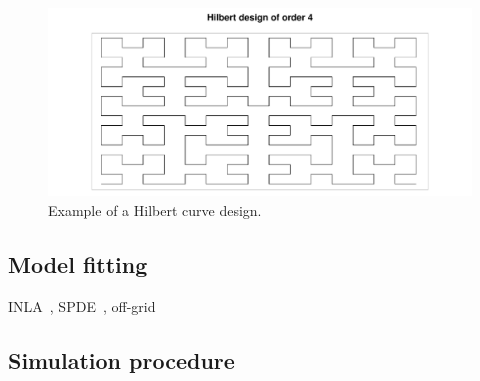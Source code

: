 \documentclass[review]{elsarticle}
\begin{document}
\begin{figure}
\includegraphics[width=5in]{Hilbert000180.pdf}
\caption{Example of a Hilbert curve design.}
\label{hilbert000180}
\end{figure}





\subsection{Model fitting}

INLA~\citep{rueetal}, SPDE~\citep{lindgrenetal}, off-grid~\citep{simpsonetal}


\subsection{Simulation procedure}
\end{document}
